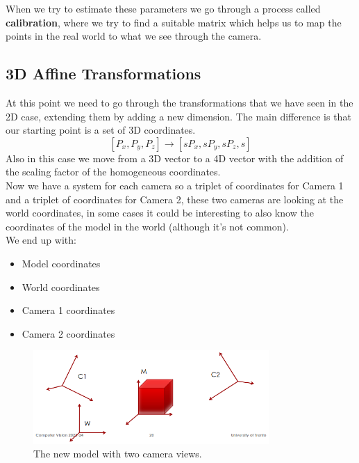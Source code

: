 When we try to estimate these parameters we go through a process called \textbf{calibration}, where we try to find a suitable matrix which helps us to map the points in the real world to what we see through the camera.

\subsection{3D Affine Transformations}

At this point we need to go through the transformations that we have seen in the 2D case, extending them by adding a new dimension. The main difference is that our starting point is a set of 3D coordinates.
\[ [P_x, P_y, P_z] \rightarrow  [sP_x, sP_y, sP_z, s] \]
Also in this case we move from a 3D vector to a 4D vector with the addition of the scaling factor of the homogeneous coordinates.
\\
Now we have a system for each camera so a triplet of coordinates for Camera 1 and a triplet of coordinates for Camera 2, these two cameras are looking at the world coordinates, in some cases it could be interesting to also know the coordinates of the model in the world (although it's not common). 
\\We end up with:
\begin{itemize} 
    \item Model coordinates
    \item World coordinates
    \item Camera 1 coordinates
    \item Camera 2 coordinates
\end{itemize}

\begin{figure}[H]
    \centering
    \includegraphics[width=0.8\textwidth]{Figures/coo.png}
    \caption{The new model with two camera views.}
    \label{fig:coo}
\end{figure}

